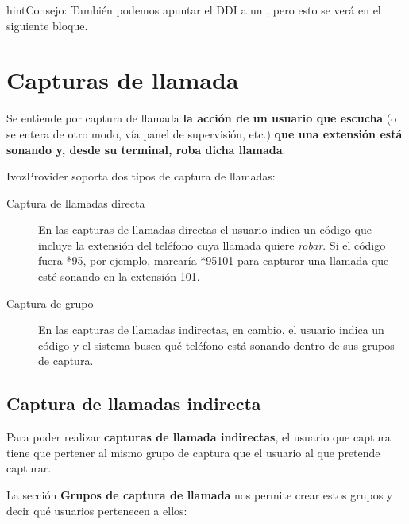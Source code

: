 \documentclass[letterpaper,10pt,spanish]{sphinxmanual}
\begin{document}
\begin{notice}{hint}{Consejo:}
También podemos apuntar el DDI a un {\hyperref[faxing/index:faxing\string-system]{}}, pero esto se verá en el siguiente bloque.
\end{notice}


\section{Capturas de llamada}
\label{pbx_features/call_captures:capture-groups}\label{pbx_features/call_captures::doc}\label{pbx_features/call_captures:call-pickup}
Se entiende por captura de llamada \textbf{la acción de un usuario que escucha} (o se entera de otro modo, vía panel de supervisión, etc.) \textbf{que una extensión está sonando y, desde su terminal, roba dicha llamada}.

IvozProvider soporta dos tipos de captura de llamadas:
\begin{description}
\item[{Captura de llamadas directa}] \leavevmode{}\label{pbx_features/call_captures:term-direct-pickup}
En las capturas de llamadas directas el usuario indica un código que incluye la extensión del teléfono cuya llamada quiere \emph{robar}. Si el código fuera *95, por ejemplo, marcaría *95101 para capturar una llamada que esté sonando en la extensión 101.

\item[{Captura de grupo}] \leavevmode{}\label{pbx_features/call_captures:term-group-pickup}
En las capturas de llamadas indirectas, en cambio, el usuario indica un código y el sistema busca qué teléfono está sonando dentro de sus grupos de captura.

\end{description}


\subsection{Captura de llamadas indirecta}
\label{pbx_features/call_captures:call-pickup-groups}
Para poder realizar \textbf{capturas de llamada indirectas}, el usuario que captura tiene que pertener al mismo grupo de captura que el usuario al que pretende capturar.

La sección \textbf{Grupos de captura de llamada} nos permite crear estos grupos y decir qué usuarios pertenecen a ellos:
\end{document}
